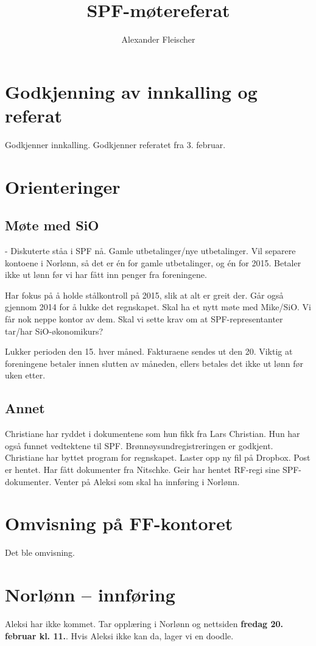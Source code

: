 \documentclass[12pt,norsk]{article}
\begin{document}
\title{SPF-møtereferat}
\author{Alexander Fleischer}
\maketitle



\section{Godkjenning av innkalling og referat}
Godkjenner innkalling.
Godkjenner referatet fra 3. februar.

\section{Orienteringer}
\subsection{Møte med SiO}
- Diskuterte ståa i SPF nå. Gamle utbetalinger/nye utbetalinger.
Vil separere kontoene i Norlønn, så det er én for gamle utbetalinger,
og én for 2015. Betaler ikke ut lønn før vi har fått inn penger fra foreningene.

Har fokus på å holde stålkontroll på 2015, slik at alt er greit der.
Går også gjennom 2014 for å lukke det regnskapet.
Skal ha et nytt møte med Mike/SiO. Vi får nok neppe
kontor av dem. 
Skal vi sette krav om at SPF-representanter
tar/har SiO-økonomikurs?

Lukker perioden den 15. hver måned. Fakturaene sendes ut den 20.
Viktig at foreningene betaler innen slutten av måneden,
ellers betales det ikke ut lønn før uken etter.

\subsection{Annet}
Christiane har ryddet i dokumentene som hun fikk fra Lars Christian.
Hun har også funnet vedtektene til SPF.
Brønnøysundregistreringen er godkjent.
Christiane har byttet program for regnskapet. Laster opp 
ny fil på Dropbox.
Post er hentet. Har fått dokumenter fra Nitschke. 
Geir har hentet RF-regi sine SPF-dokumenter.
Venter på Aleksi som skal ha innføring i Norlønn.

\section{Omvisning på FF-kontoret}
Det ble omvisning.

\section{Norlønn -- innføring}
Aleksi har ikke kommet. Tar opplæring i Norlønn og nettsiden
\textbf{fredag 20. februar kl. 11.}.
Hvis Aleksi ikke kan da, lager vi en doodle.
\end{document}
